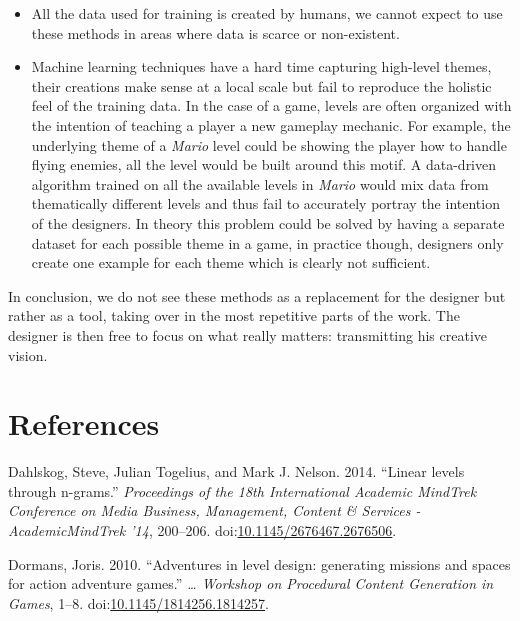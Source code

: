 \documentclass[A4paper,]{article}
\providecommand{\tightlist}{%
  \setlength{\itemsep}{0pt}\setlength{\parskip}{0pt}}
\begin{document}
\begin{itemize}
\tightlist
\item
  All the data used for training is created by humans, we cannot expect
  to use these methods in areas where data is scarce or non-existent.
\item
  Machine learning techniques have a hard time capturing high-level
  themes, their creations make sense at a local scale but fail to
  reproduce the holistic feel of the training data. In the case of a
  game, levels are often organized with the intention of teaching a
  player a new gameplay mechanic. For example, the underlying theme of a
  \emph{Mario} level could be showing the player how to handle flying
  enemies, all the level would be built around this motif. A data-driven
  algorithm trained on all the available levels in \emph{Mario} would
  mix data from thematically different levels and thus fail to
  accurately portray the intention of the designers. In theory this
  problem could be solved by having a separate dataset for each possible
  theme in a game, in practice though, designers only create one example
  for each theme which is clearly not sufficient.
\end{itemize}

In conclusion, we do not see these methods as a replacement for the
designer but rather as a tool, taking over in the most repetitive parts
of the work. The designer is then free to focus on what really matters:
transmitting his creative vision.

\section*{References}\label{references}

\hypertarget{refs}{}
\hypertarget{ref-Dahlskog2014}{}
Dahlskog, Steve, Julian Togelius, and Mark J. Nelson. 2014. ``Linear
levels through n-grams.'' \emph{Proceedings of the 18th International
Academic MindTrek Conference on Media Business, Management, Content \&
Services - AcademicMindTrek '14}, 200--206.
doi:\href{https://doi.org/10.1145/2676467.2676506}{10.1145/2676467.2676506}.

\hypertarget{ref-Dormans2010}{}
Dormans, Joris. 2010. ``Adventures in level design: generating missions
and spaces for action adventure games.'' \emph{\ldots{} Workshop on
Procedural Content Generation in Games}, 1--8.
doi:\href{https://doi.org/10.1145/1814256.1814257}{10.1145/1814256.1814257}.
\end{document}
